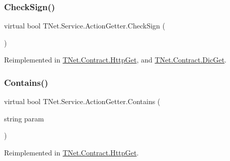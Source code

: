 \subsubsection{\texorpdfstring{Check\+Sign()}{CheckSign()}}
{\footnotesize\ttfamily virtual bool T\+Net.\+Service.\+Action\+Getter.\+Check\+Sign (\begin{DoxyParamCaption}{ }\end{DoxyParamCaption})\hspace{0.3cm}{\ttfamily [virtual]}}







Reimplemented in \mbox{\hyperlink{class_t_net_1_1_contract_1_1_http_get_a7efaceab7af2c1cb106ac7ecb509bced}{T\+Net.\+Contract.\+Http\+Get}}, and \mbox{\hyperlink{class_t_net_1_1_contract_1_1_dic_get_a8e88c8fa7eb83c4596a9cff5ac438281}{T\+Net.\+Contract.\+Dic\+Get}}.

\mbox{\label{class_t_net_1_1_service_1_1_action_getter_a9a1e277743b2cc5c2a8e9485e16a0060}} 
\subsubsection{\texorpdfstring{Contains()}{Contains()}}
{\footnotesize\ttfamily virtual bool T\+Net.\+Service.\+Action\+Getter.\+Contains (\begin{DoxyParamCaption}\item[{string}]{param }\end{DoxyParamCaption})\hspace{0.3cm}{\ttfamily [virtual]}}







Reimplemented in \mbox{\hyperlink{class_t_net_1_1_contract_1_1_http_get_a044f2a121dfb996b4edf9a1e46e3a8a9}{T\+Net.\+Contract.\+Http\+Get}}.

\mbox{\label{class_t_net_1_1_service_1_1_action_getter_aaae6e4e9d0becae6b8b75757243e89df}} 
